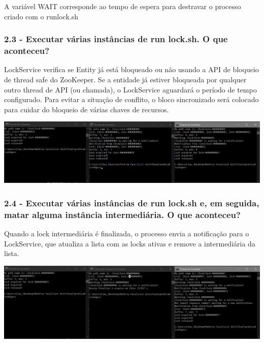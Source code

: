 A variável WAIT corresponde ao tempo de espera para destravar o processo criado com o runlock.sh

\subsubsection{2.3 - Executar várias instâncias de run lock.sh. O que aconteceu?}

LockService verifica se Entity já está bloqueado ou não usando a API de bloqueio de thread safe do ZooKeeper. Se a entidade já estiver bloqueada por qualquer outro thread de API (ou chamada), o LockService aguardará o período de tempo configurado. Para evitar a situação de conflito, o bloco sincronizado será colocado para cuidar do bloqueio de várias chaves de recursos.
\newline

\begin{center}
\includegraphics[width=20cm]{pratica4/prints/roteiro 2.3.PNG}
\end{center}

\subsubsection{2.4 - Executar várias instâncias de run lock.sh e, em seguida, matar
alguma instância intermediária. O que aconteceu?}

Quando a lock intermediária é finalizada, o processo envia a notificação para o LockService, que atualiza a lista com as locks ativas e remove a intermediária da lista.
\newline
\begin{center}
\includegraphics[width=20cm]{pratica4/prints/roteiro 2.4.PNG}
\end{center}